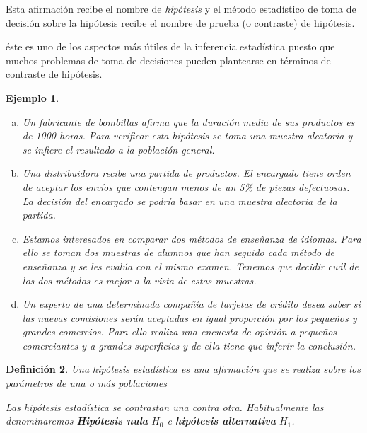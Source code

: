 \documentclass[12pt]{report}
\newtheorem{definition}{Definici\'on}
\newtheorem{example}[definition]{Ejemplo}
\begin{document}
     Esta afirmación recibe el nombre de
     \emph{hipótesis} y el método estadístico de toma de decisión
      sobre la  hipótesis recibe el nombre de prueba (o contraste)
       de hipótesis.

     éste es uno de los aspectos más útiles de la inferencia
     estadística puesto que muchos problemas de toma de decisiones
     pueden plantearse en términos de contraste de hipótesis.

   \begin{example}
    \begin{enumerate}[a)]

  \item Un fabricante de bombillas afirma que la duración media de sus
    productos es de 1000 horas. Para verificar esta hipótesis se toma una
    muestra aleatoria y se infiere el resultado a la población
    general. 
  \item Una distribuidora recibe una partida de productos. El encargado
    tiene orden de aceptar los envíos que contengan menos de un 5\% de
    piezas defectuosas. La decisión del encargado se podría basar en una
    muestra aleatoria de la partida.
%        
%        

\item Estamos interesados en comparar dos métodos de enseñanza de
    idiomas. Para ello se toman dos muestras de alumnos que han seguido
    cada método de enseñanza y se les evalúa con el mismo examen.
    Tenemos que decidir cuál de los dos métodos es mejor a la vista
    de estas muestras. 
    \item Un experto de una determinada compañía de tarjetas de crédito
     desea saber si las nuevas comisiones serán aceptadas en igual
     proporción por los pequeños y grandes comercios.
     Para ello realiza una encuesta de opinión a pequeños comerciantes y a
     grandes superficies y de ella tiene que inferir la conclusión.
\end{enumerate}
\end{example}
%  
%  
   \begin{definition}
    Una hipótesis estadística es una afirmación que se realiza sobre
    los parámetros de una o más poblaciones

Las hipótesis estadística se contrastan una contra otra. Habitualmente las
denominaremos  \textbf{Hipótesis nula} $H_{0}$  e  \textbf{hipótesis alternativa}
$H_{1}$.
\end{definition}

%  
%
%  
%
\end{document}
